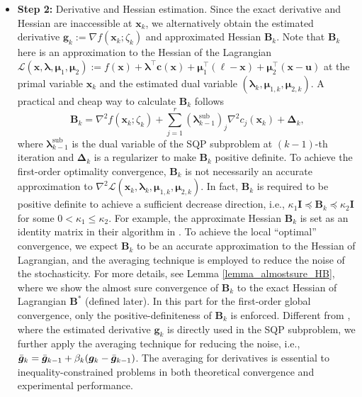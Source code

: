 \documentclass[aos]{imsart}
\numberwithin{equation}{section}
\theoremstyle{plain}
\begin{document}
\begin{itemize}
    \item \textbf{Step 2:} Derivative and Hessian estimation. Since the exact derivative and Hessian are inaccessible at $\bm{x}_k$, we alternatively obtain the estimated derivative $\bm{g}_k := \nabla f(\bm{x}_k; \zeta_k)$ and approximated Hessian $\bm{B}_k$. Note that $\bm{B}_k$ here is an approximation to the Hessian of the Lagrangian $\mathcal{L}(\bm{x},\bm{\lambda}, \bm{\mu}_1, \bm{\mu}_2) := f(\bm{x}) + \bm{\lambda}^{\top} \bm{c}(\bm{x}) +  \bm{\mu}_1^{\top}\left(\bm{\ell} - \bm{x} \right) + \bm{\mu}_2^{\top}\left(\bm{x} - \bm{u} \right)$ at the primal variable $\bm{x}_k$ and the estimated dual variable $\left(\bm{\lambda}_{k}, \bm{\mu}_{1,k}, \bm{\mu}_{2,k} \right)$. A practical and cheap way to calculate $\bm{B}_k$ follows
    \begin{equation}
        \bm{B}_k = \nabla^2 f(\bm{x}_k;\zeta_k) + \sum_{j=1}^{r}(\bm{\lambda}_{k-1}^{\text{sub}})_{j} \nabla^2 c_j(\bm{x}_k) + \bm{\Delta}_k,
    \end{equation}
    where $\bm{\lambda}_{k-1}^{\text{sub}}$ is the dual variable of the SQP subproblem at $(k-1)$-th iteration and $\bm{\Delta}_k$ is a regularizer to make $\bm{B}_k$ positive definite.
    To achieve the first-order optimality convergence, $\bm{B}_k$ is not necessarily an accurate approximation to $\nabla^2 \mathcal{L}(\bm{x}_k, \bm{\lambda}_{k}, \bm{\mu}_{1,k}, \bm{\mu}_{2,k})$. In fact, $\bm{B}_k$ is required to be positive definite to achieve a sufficient decrease direction, i.e.,  $\kappa_1 \mathbf{I} \preceq \bm{B}_k \preceq \kappa_2 \mathbf{I}$ for some $0<\kappa_1 \leq \kappa_2$. For example, the approximate Hessian $\bm{B}_k$ is set as an identity matrix in their algorithm in \cite{curtis2023sequential}. To achieve the local ``optimal'' convergence, we expect $\bm{B}_k$ to be an accurate approximation to the Hessian of Lagrangian, and the averaging technique is employed to reduce the noise of the stochasticity. For more details, see Lemma \ref{lemma_almostsure_HB}, where we show the almost sure convergence of $\bm{B}_k$ to the exact Hessian of Lagrangian $\bm{B}^{*}$ (defined later).
In this part for the first-order global convergence, only the positive-definiteness of $\bm{B}_k$ is enforced. Different from \cite{curtis2023sequential}, where the estimated derivative $\bm{g}_k$ is directly used in the SQP subproblem, we further apply the averaging technique for reducing the noise, i.e., $\Bar{\bm{g}}_k = \Bar{\bm{g}}_{k-1} + \beta_k (\bm{g}_k - \Bar{\bm{g}}_{k-1})$. The averaging for derivatives is essential to inequality-constrained problems in both theoretical convergence and experimental performance. 

\end{itemize}
\end{document}
